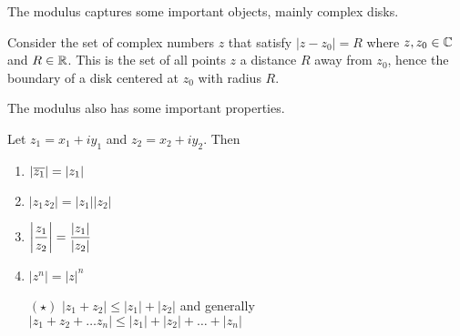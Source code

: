 \documentclass[../notes.tex]{subfiles}
\begin{document}
The modulus captures some important objects, mainly complex disks.

\begin{example}
    Consider the set of complex numbers $z$ that satisfy $|z - z_0| = R$ where $z,z_0 \in \mathbb{C}$ and $R \in \mathbb{R}$. This is the set of all points $z$ a distance $R$ away from $z_0$, hence the boundary of a disk centered at $z_0$ with radius $R$.
\end{example}

The modulus also has some important properties.

\begin{theorem}
    \label{thm:propsmodulus}
    Let $z_1 = x_1 + iy_1$ and $z_2 = x_2 + iy_2$. Then
    \begin{enumerate}
        \item $|\overline{z_1}| = |z_1|$
        \item $|z_1 z_2| = |z_1| |z_2|$
        \item $\displaystyle \qty|\frac{z_1}{z_2}| = \frac{|z_1|}{|z_2|}$
        \item $|z^n| = |z|^n$
        \item[$(\star)$] $|z_1 + z_2| \leq |z_1| + |z_2|$ and generally $|z_1 + z_2 + \ldots z_n| \leq |z_1| + |z_2| + \ldots + |z_n|$
    \end{enumerate}
\end{theorem}
\end{document}
